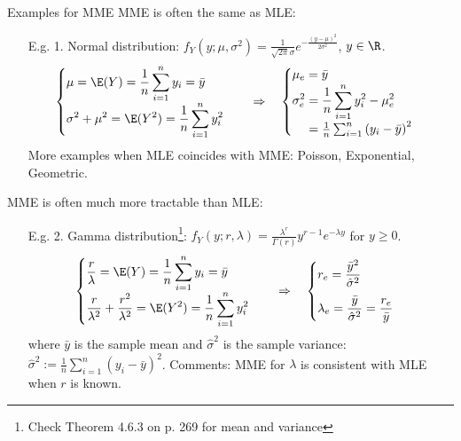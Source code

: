 \begin{frame}{Examples for MME}
 MME is often the same as MLE:\\
 \vfill
 \begin{enumerate}
  \item[E.g. 1.] Normal distribution: $f_Y(y;\mu,\sigma^2)= \frac{1}{\sqrt{2\pi} \sigma} e^{-\frac{(y-\mu)^2}{2\sigma^2}}$, $y\in\R$.
  \vfill
  \[
  \begin{cases}
   \displaystyle
   \mu  = \E(Y) = \frac{1}{n} \sum_{i=1}^n y_i = \bar{y}\\
   \displaystyle
   \sigma^2 + \mu^2  = \E(Y^2) = \frac{1}{n} \sum_{i=1}^n y_i^2 \\
  \end{cases}
  \quad\Rightarrow\quad
  \begin{cases}
   \displaystyle
   \mu_e  =  \bar{y}\\
   \displaystyle
   \sigma_e^2 = \frac{1}{n} \sum_{i=1}^n y_i^2 -\mu_e^2 \\
   \phantom{\sigma_e^2 }= \frac{1}{n}\sum_{i=1}^n\left(y_i-\bar{y}\right)^2
  \end{cases}
  \]
\vfill
More examples when MLE coincides with MME: Poisson, Exponential, Geometric.
\end{enumerate}
\end{frame}
\begin{frame}
MME is often much more tractable than MLE:\\
 \vfill
 \begin{enumerate}
  \item[E.g. 2.] Gamma distribution\footnote{Check Theorem 4.6.3 on p. 269 for mean and variance}: $f_Y(y;r, \lambda)= \frac{\lambda^r}{\Gamma(r)} y^{r-1} e^{-\lambda y}$ for $y\ge 0$.
  \[
  \begin{cases}
   \displaystyle
   \frac{r}{\lambda} = \E(Y) = \frac{1}{n} \sum_{i=1}^n y_i = \bar{y}\\
   \displaystyle
   \frac{r}{\lambda^2} + \frac{r^2}{\lambda^2}  = \E(Y^2) = \frac{1}{n} \sum_{i=1}^n y_i^2 \\
  \end{cases}
  \quad\Rightarrow\quad
  \begin{cases}
   \displaystyle
   r_e = \frac{\bar{y}^2}{\hat{\sigma}^2} \\[1em]
   \displaystyle
   \lambda_e = \frac{\bar{y}}{\hat{\sigma}^2} = \frac{r_e}{\bar{y}}
  \end{cases}
  \]
  where $\bar{y}$ is the sample mean and $\hat{\sigma}^2$ is the sample variance: $\hat{\sigma}^2:= \frac{1}{n}\sum_{i=1}^n(y_i-\bar{y})^2$.
  \vfill
 Comments: MME for $\lambda$ is consistent with MLE when $r$ is known.
 \end{enumerate}
 \end{frame}
